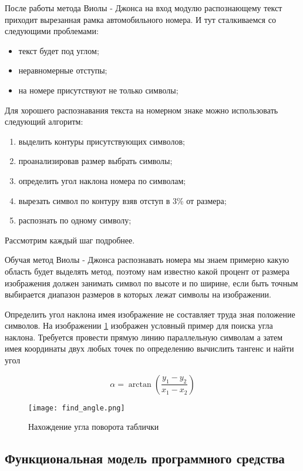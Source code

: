 После работы метода Виолы - Джонса на вход модулю распознающему текст приходит вырезанная рамка автомобильного номера. И тут сталкиваемся со следующими проблемами:
\begin{itemize}
	\item текст будет под углом;
	\item неравномерные отступы;
	\item на номере присутствуют не только символы;
\end{itemize}

Для хорошего распознавания текста на номерном знаке можно использовать следующий алгоритм:
\begin{enumerate}
	\item выделить контуры присутствующих символов;
	\item проанализировав размер выбрать символы;
	\item определить угол наклона номера по символам;
	\item вырезать символ по контуру взяв отступ в 3\% от размера;
	\item распознать по одному символу;
\end{enumerate} 
Рассмотрим каждый шаг подробнее.

Обучая метод Виолы - Джонса распознавать номера мы знаем примерно какую область будет выделять метод, поэтому нам известно какой процент от размера изображения должен занимать символ по высоте и по ширине, если быть точным выбирается диапазон размеров в которых лежат символы на изображении.

Определить угол наклона имея изображение не составляет труда зная положение символов. На изображении \ref{fig:funcreq:analisys} изображен условный пример для поиска угла наклона. Требуется провести прямую линию параллельную символам а затем имея координаты двух любых точек по определению вычислить тангенс и найти угол

$$ \alpha = \arctan(\frac{y_1 - y_2}{x_1 - x_2}) $$

\begin{figure}[ht]
\centering
    \texttt{[image: find\_angle.png]}  
    \caption{Нахождение угла поворота таблички}
    \label{fig:funcreq:analisys}
\end{figure}

\subsection{Функциональная модель программного средства}
\label{sec:funcreq:funcmodel}

